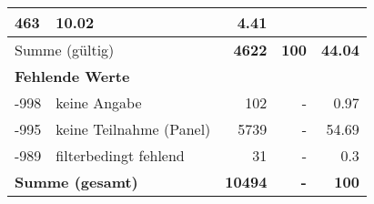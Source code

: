 \begin{longtable}{lXrrr}
       \num{463} &
       \num[round-mode=places,round-precision=2]{10.02} &
         \num[round-mode=places,round-precision=2]{4.41} \\
     \midrule
     \multicolumn{2}{l}{Summe (gültig)} &
       \textbf{\num{4622}} &
     \textbf{\num{100}} &
       \textbf{\num[round-mode=places,round-precision=2]{44.04}} \\
     \multicolumn{5}{l}{\textbf{Fehlende Werte}}\\
       -998 &
       keine Angabe &
         \num{102} &
        - &
         \num[round-mode=places,round-precision=2]{0.97} \\
       -995 &
       keine Teilnahme (Panel) &
         \num{5739} &
        - &
         \num[round-mode=places,round-precision=2]{54.69} \\
       -989 &
       filterbedingt fehlend &
         \num{31} &
        - &
         \num[round-mode=places,round-precision=2]{0.3} \\
     \midrule
     \multicolumn{2}{l}{\textbf{Summe (gesamt)}} &
          \textbf{\num{10494}} &
        \textbf{-} &
        \textbf{\num{100}} \\
     \bottomrule
     \end{longtable}
     
